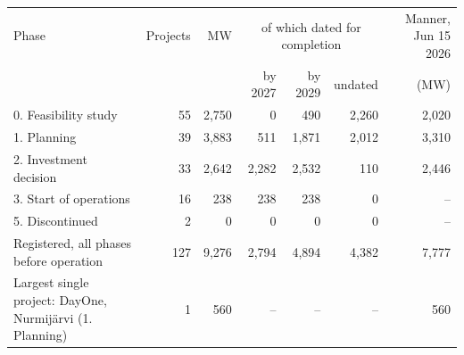 \begin{tabular}{p{6.4cm}rrrrrr}
\toprule
Phase & Projects & MW & \multicolumn{3}{c}{of which dated for completion} & Manner, Jun 15 2026 \\
 & & & by 2027 & by 2029 & undated & (MW) \\
\midrule
0. Feasibility study & 55 & 2,750 & 0 & 490 & 2,260 & 2,020 \\
1. Planning & 39 & 3,883 & 511 & 1,871 & 2,012 & 3,310 \\
2. Investment decision & 33 & 2,642 & 2,282 & 2,532 & 110 & 2,446 \\
3. Start of operations & 16 & 238 & 238 & 238 & 0 & -- \\
5. Discontinued & 2 & 0 & 0 & 0 & 0 & -- \\
Registered, all phases before operation & 127 & 9,276 & 2,794 & 4,894 & 4,382 & 7,777 \\
Largest single project: DayOne, Nurmijärvi (1. Planning) & 1 & 560 & -- & -- & -- & 560 \\
\bottomrule
\end{tabular}